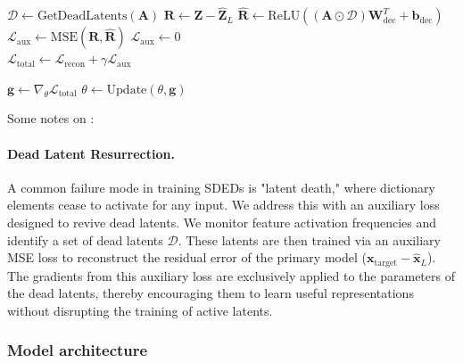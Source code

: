 \begin{algorithm}[h]
\begin{algorithmic}[1]
    \Statex {}
    \State $\mathcal{D} \gets \text{GetDeadLatents}(\mathbf{A})$
     
        \State $\mathbf{R} \gets \mathbf{Z} - \hat{\mathbf{Z}}_L$ 
        \State $\hat{\mathbf{R}} \gets \text{ReLU}((\mathbf{A} \odot \mathcal{D}) \mathbf{W}_{\text{dec}}^T + \mathbf{b}_{\text{dec}})$ 
        \State $\mathcal{L}_{\text{aux}} \gets \text{MSE}(\mathbf{R}, \hat{\mathbf{R}})$ 
    \Else
        \State $\mathcal{L}_{\text{aux}} \gets 0$
    \EndIf
    \\
    \State $\mathcal{L}_{\text{total}} \gets \mathcal{L}_{\text{recon}} + \gamma \mathcal{L}_{\text{aux}}$ 

    \Statex {}
    \State $\mathbf{g} \gets \nabla_{\theta} \mathcal{L}_{\text{total}}$ 
    \State $\theta \gets \text{Update}(\theta, \mathbf{g})$ 
\EndProcedure
\end{algorithmic}
\end{algorithm}

Some notes on :

\paragraph{Dead Latent Resurrection.}
A common failure mode in training SDEDs is "latent death," where dictionary elements cease to activate for any input. We address this with an auxiliary loss designed to revive dead latents. We monitor feature activation frequencies and identify a set of dead latents $\mathcal{D}$. These latents are then trained via an auxiliary MSE loss to reconstruct the residual error of the primary model ($\mathbf{x}_{\text{target}} - \hat{\mathbf{x}}_L$). The gradients from this auxiliary loss are exclusively applied to the parameters of the dead latents, thereby encouraging them to learn useful representations without disrupting the training of active latents.

\subsubsection{Model architecture}
\label{subsubsection:model_architecture_details}

